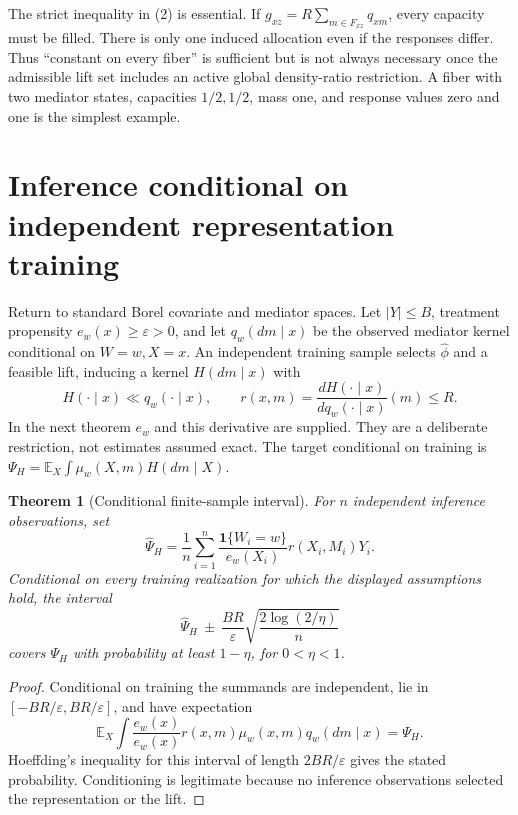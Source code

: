 \documentclass[11pt]{article}
\newtheorem{theorem}{Theorem}
\theoremstyle{remark}
\newcommand{\E}{\mathbb E}
\newcommand{\Ind}{\mathbf 1}
\begin{document}
The strict inequality in (2) is essential. If $g_{xz}=R\sum_{m\in F_{xz}}q_{xm}$, every capacity must be filled. There is only one induced allocation even if the responses differ. Thus ``constant on every fiber'' is sufficient but is not always necessary once the admissible lift set includes an active global density-ratio restriction. A fiber with two mediator states, capacities $1/2,1/2$, mass one, and response values zero and one is the simplest example.

\section{Inference conditional on independent representation training}
Return to standard Borel covariate and mediator spaces. Let $|Y|\leq B$, treatment propensity $e_w(x)\geq\varepsilon>0$, and let $q_w(dm\mid x)$ be the observed mediator kernel conditional on $W=w,X=x$. An independent training sample selects $\widehat\phi$ and a feasible lift, inducing a kernel $H(dm\mid x)$ with
\[
 H(\cdot\mid x)\ll q_w(\cdot\mid x),\qquad
 r(x,m)=\frac{dH(\cdot\mid x)}{dq_w(\cdot\mid x)}(m)\leq R.
\]
In the next theorem $e_w$ and this derivative are supplied. They are a deliberate restriction, not estimates assumed exact. The target conditional on training is
$\Psi_H=\E_X\int\mu_w(X,m)H(dm\mid X)$.

\begin{theorem}[Conditional finite-sample interval]\label{inference}
For $n$ independent inference observations, set
\[
 \widehat\Psi_H=\frac1n\sum_{i=1}^n
       \frac{\Ind\{W_i=w\}}{e_w(X_i)}r(X_i,M_i)Y_i.
\]
Conditional on every training realization for which the displayed assumptions hold, the interval
\[
 \widehat\Psi_H\ \pm\ \frac{BR}{\varepsilon}
                  \sqrt{\frac{2\log(2/\eta)}{n}}
\]
covers $\Psi_H$ with probability at least $1-\eta$, for $0<\eta<1$.
\end{theorem}
\begin{proof}
Conditional on training the summands are independent, lie in
$[-BR/\varepsilon,BR/\varepsilon]$, and have expectation
\[
 \E_X\int\frac{e_w(x)}{e_w(x)}r(x,m)\mu_w(x,m)q_w(dm\mid x)
       =\Psi_H.
\]
Hoeffding's inequality for this interval of length $2BR/\varepsilon$ gives the stated probability. Conditioning is legitimate because no inference observations selected the representation or the lift.
\end{proof}
\end{document}

